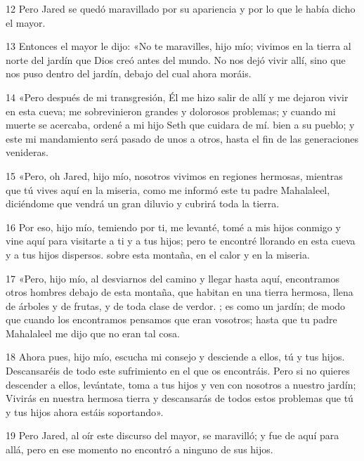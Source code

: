 \par 12 Pero Jared se quedó maravillado por su apariencia y por lo que le había dicho el mayor.

\par 13 Entonces el mayor le dijo: «No te maravilles, hijo mío; vivimos en la tierra al norte del jardín que Dios creó antes del mundo. No nos dejó vivir allí, sino que nos puso dentro del jardín, debajo del cual ahora moráis.

\par 14 «Pero después de mi transgresión, Él me hizo salir de allí y me dejaron vivir en esta cueva; me sobrevinieron grandes y dolorosos problemas; y cuando mi muerte se acercaba, ordené a mi hijo Seth que cuidara de mí. bien a su pueblo; y este mi mandamiento será pasado de unos a otros, hasta el fin de las generaciones venideras.

\par 15 «Pero, oh Jared, hijo mío, nosotros vivimos en regiones hermosas, mientras que tú vives aquí en la miseria, como me informó este tu padre Mahalaleel, diciéndome que vendrá un gran diluvio y cubrirá toda la tierra.

\par 16 Por eso, hijo mío, temiendo por ti, me levanté, tomé a mis hijos conmigo y vine aquí para visitarte a ti y a tus hijos; pero te encontré llorando en esta cueva y a tus hijos dispersos. sobre esta montaña, en el calor y en la miseria.

\par 17 «Pero, hijo mío, al desviarnos del camino y llegar hasta aquí, encontramos otros hombres debajo de esta montaña, que habitan en una tierra hermosa, llena de árboles y de frutas, y de toda clase de verdor. ; es como un jardín; de modo que cuando los encontramos pensamos que eran vosotros; hasta que tu padre Mahalaleel me dijo que no eran tal cosa.

\par 18 Ahora pues, hijo mío, escucha mi consejo y desciende a ellos, tú y tus hijos. Descansaréis de todo este sufrimiento en el que os encontráis. Pero si no quieres descender a ellos, levántate, toma a tus hijos y ven con nosotros a nuestro jardín; Vivirás en nuestra hermosa tierra y descansarás de todos estos problemas que tú y tus hijos ahora estáis soportando».

\par 19 Pero Jared, al oír este discurso del mayor, se maravilló; y fue de aquí para allá, pero en ese momento no encontró a ninguno de sus hijos.

